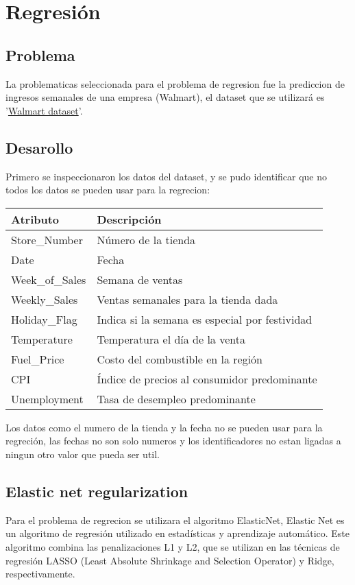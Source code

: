 \documentclass[11pt]{article}
\begin{document}
\section{Regresión}
\label{sec:orgeb22a64}
\subsection{Problema}
\label{sec:orgd88bdfe}
La problematicas seleccionada para el problema de regresion fue la
prediccion de ingresos semanales de una empresa (Walmart), el dataset
que se utilizará es '\href{https://www.kaggle.com/datasets/yasserh/walmart-dataset}{Walmart dataset}'.

\subsection{Desarollo}
\label{sec:org0c7eec7}
Primero se inspeccionaron los datos del dataset, y se pudo identificar
que no todos los datos se pueden usar para la regrecion: 

\begin{center}
\begin{tabularx}{0.8\textwidth}{l|l}
Atributo & Descripción\\
\hline
Store\_Number & Número de la tienda\\
Date & Fecha\\
Week\_of\_Sales & Semana de ventas\\
Weekly\_Sales & Ventas semanales para la tienda dada\\
Holiday\_Flag & Indica si la semana es especial por festividad\\
Temperature & Temperatura el día de la venta\\
Fuel\_Price & Costo del combustible en la región\\
CPI & Índice de precios al consumidor predominante\\
Unemployment & Tasa de desempleo predominante\\
\end{tabularx}

\end{center}

Los datos como el numero de la tienda y la fecha no se pueden usar
para la regreción, las fechas no son solo numeros y los
identificadores no estan ligadas a ningun otro valor que pueda ser
util.

\subsection{Elastic net regularization}
\label{sec:org7bc1120}
\autocite{wiki:Elastic_net_regularization} Para el problema de
regrecion se utilizara el algoritmo ElasticNet, Elastic Net es un
algoritmo de regresión utilizado en estadísticas y aprendizaje
automático. Este algoritmo combina las penalizaciones L1 y L2, que se
utilizan en las técnicas de regresión LASSO (Least Absolute Shrinkage
and Selection Operator) y Ridge, respectivamente. \\
\end{document}
